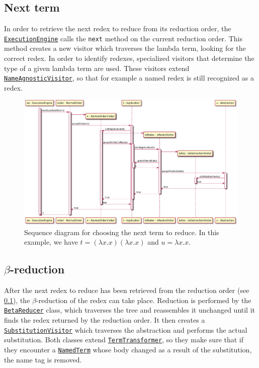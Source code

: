\subsection{Next term}
\label{sec:nt}
In order to retrieve the next redex to reduce from its reduction order, the
\texttt{\hyperref[type:edu.kit.wavelength.client.model.ExecutionEngine]{ExecutionEngine}}
calls the \texttt{next} method on the current reduction order. This method creates a new visitor which traverses
the lambda term, looking for the correct redex. In order to identify redexes,
specialized visitors that determine the type of a given lambda term are used.
These visitors extend \texttt{\hyperref[type:edu.kit.wavelength.client.model.term.NameAgnosticVisitor]{NameAgnosticVisitor}},
so that for example a named redex is still recognized as a redex.



\begin{figure}[H]
	\centering
	\includegraphics[width=\textwidth]{sequenceDiagrams/nextTerm}
	\caption{Sequence diagram for choosing the next term to reduce. In this example, we have $t = (\lambda x.x)(\lambda x.x)$ and $u = \lambda x.x$.}
\end{figure}


\subsection{$\beta$-reduction}
After the next redex to reduce has been retrieved from the reduction order (see \ref{sec:nt}),
the $\beta$-reduction of the redex can take place. Reduction is performed by the
\texttt{\hyperref[type:edu.kit.wavelength.client.model.term.BetaReducer]{BetaReducer}}
class, which traverses the tree and reassembles it unchanged until it finds the
redex returned by the reduction order. It then creates a
\texttt{\hyperref[type:edu.kit.wavelength.client.model.term.SustitutionVisitor]{SubstitutionVisitor}}
which traverses the abstraction and performs the actual substitution. Both classes
extend \texttt{\hyperref[type:edu.kit.wavelength.client.model.term.TermTransformer]{TermTransformer}},
so they make sure that if they encounter a \texttt{\hyperref[type:edu.kit.wavelength.client.model.term.NamedTerm]{NamedTerm}}
whose body changed as a result of the substitution, the name tag is removed.


